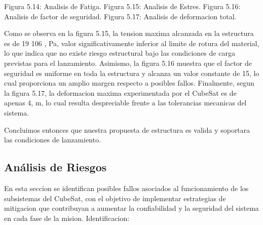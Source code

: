     Figura 5.14: Analisis de Fatiga.
    Figura 5.15: Analisis de Estres.
    Figura 5.16: Analisis de factor de seguridad. Figura 5.17: Analisis de deformacion total.

    Como se observa en la figura 5.15, la tension
    maxima alcanzada en la estructura es de 19  106 , Pa, valor significativamente inferior al
    limite de rotura del material, lo que indica que no existe riesgo estructural bajo las
    condiciones de carga previstas para el lanzamiento. Asimismo, la figura 5.16 muestra que el factor
    de seguridad es uniforme en toda la estructura y alcanza un valor constante de 15, lo cual
    proporciona un amplio margen respecto a posibles fallos. Finalmente, segun la figura 5.17,
    la deformacion maxima experimentada por el CubeSat es de apenas 4, m, lo cual resulta
    despreciable frente a las tolerancias mecanicas del sistema.

    Concluimos entonces que nuestra propuesta de estructura es valida y soportara las condiciones de lanzamiento.

  \subsection{Análisis de Riesgos}
    En esta seccion se identifican posibles fallos asociados al funcionamiento de los subsistemas
    del CubeSat, con el objetivo de implementar estrategias de mitigacion que contribuyan a
    aumentar la confiabilidad y la seguridad del sistema en cada fase de la mision. Identificacion:

